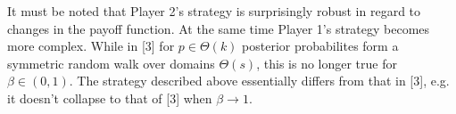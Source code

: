 It must be noted that Player 2's strategy is surprisingly robust in regard to
changes in the payoff function. At the same time Player 1's strategy becomes
more complex. While in [3] for $p \in \Theta(k)$ posterior probabilites form a
symmetric random walk over domains $\Theta(s)$, this is no longer true for
$\beta \in (0, 1)$. The strategy described above essentially differs from that
in [3], e.g. it doesn't collapse to that of [3] when $\beta \rightarrow 1$.




